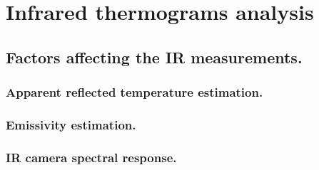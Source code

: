 \pagestyle{standard}

\chapter{Infrared thermograms analysis}\label{chapter3}

	\thispagestyle{chapter-first-page}

	\section{Factors affecting the IR measurements.}\label{section3.1}
	
		\subsection{Apparent reflected temperature estimation.}\label{section3.1.1}
	
		\subsection{Emissivity estimation.}\label{section3.1.2}
		
		\subsection{IR camera spectral response.}\label{section3.1.3}
		
		
	